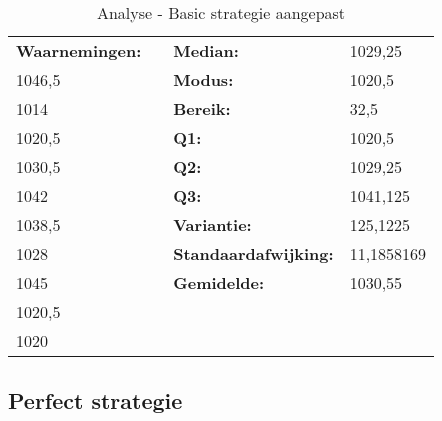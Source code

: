 \documentclass[conference]{IEEEtran}
\begin{document}
\begin{table}[htbp]
\caption{Analyse - Basic strategie aangepast}
\tiny
\centering
\begin{tabular}{|l|lll}
\cline{1-1} \cline{3-4}
\textbf{Waarnemingen:} & \multicolumn{1}{l|}{} & \multicolumn{1}{l|}{\textbf{Median:}} & \multicolumn{1}{l|}{1029,25} \\ \cline{1-1} \cline{3-4} 
1046,5 & \multicolumn{1}{l|}{} & \multicolumn{1}{l|}{\textbf{Modus:}} & \multicolumn{1}{l|}{1020,5} \\ \cline{1-1} \cline{3-4} 
1014 & \multicolumn{1}{l|}{} & \multicolumn{1}{l|}{\textbf{Bereik:}} & \multicolumn{1}{l|}{32,5} \\ \cline{1-1} \cline{3-4} 
1020,5 & \multicolumn{1}{l|}{} & \multicolumn{1}{l|}{\textbf{Q1:}} & \multicolumn{1}{l|}{1020,5} \\ \cline{1-1} \cline{3-4} 
1030,5 & \multicolumn{1}{l|}{} & \multicolumn{1}{l|}{\textbf{Q2:}} & \multicolumn{1}{l|}{1029,25} \\ \cline{1-1} \cline{3-4} 
1042 & \multicolumn{1}{l|}{} & \multicolumn{1}{l|}{\textbf{Q3:}} & \multicolumn{1}{l|}{1041,125} \\ \cline{1-1} \cline{3-4} 
1038,5 & \multicolumn{1}{l|}{} & \multicolumn{1}{l|}{\textbf{Variantie:}} & \multicolumn{1}{l|}{125,1225} \\ \cline{1-1} \cline{3-4} 
1028 & \multicolumn{1}{l|}{} & \multicolumn{1}{l|}{\textbf{Standaardafwijking:}} & \multicolumn{1}{l|}{11,1858169} \\ \cline{1-1} \cline{3-4} 
1045 & \multicolumn{1}{l|}{} & \multicolumn{1}{l|}{\textbf{Gemidelde:}} & \multicolumn{1}{l|}{1030,55} \\ \cline{1-1} \cline{3-4} 
1020,5 &  &  &  \\ \cline{1-1}
1020 &  & \textbf{} &  \\ \cline{1-1}
\end{tabular}
\end{table}

\subsection{Perfect strategie}
\end{document}
